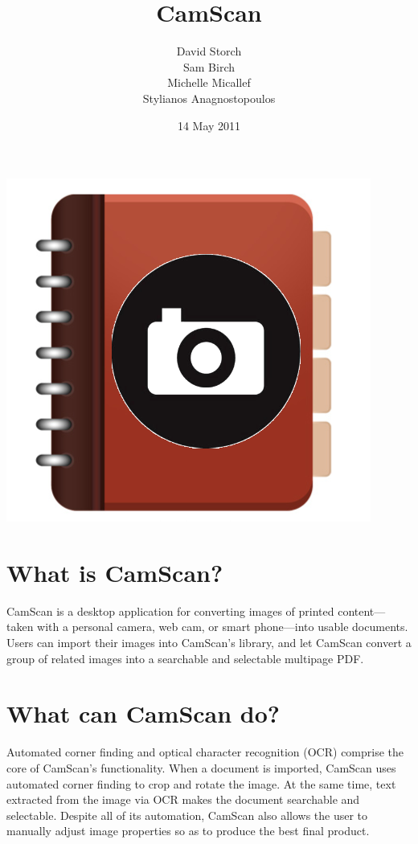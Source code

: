 \documentclass[11pt]{article}
\title{CamScan}
\author{David Storch \\
	   Sam Birch \\
	   Michelle Micallef \\
	   Stylianos Anagnostopoulos}
\date{14 May 2011}
\begin{document}
\maketitle

\centering
\includegraphics[scale=0.4]{CamscanLogo}
\flushleft

\section*{What is CamScan?}

CamScan is a desktop application for converting images of printed content---taken with a personal camera, web cam, or smart phone---into usable documents. Users can import their images into CamScan's library, and let CamScan convert a group of related images into a searchable and selectable multipage PDF.

\section*{What can CamScan do?}

Automated corner finding and optical character recognition (OCR) comprise the core of CamScan's functionality. When a document is imported, CamScan uses automated corner finding to crop and rotate the image. At the same time, text extracted from the image via OCR makes the document searchable and selectable. Despite all of its automation, CamScan also allows the user to manually adjust image properties so as to produce the best final product.
\end{document}
